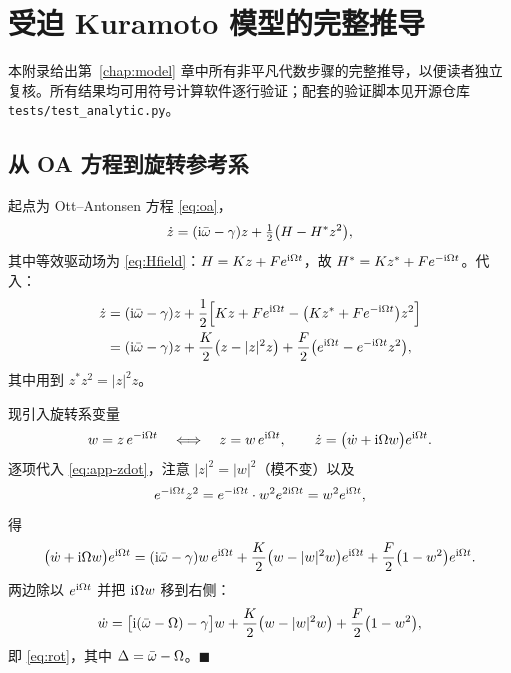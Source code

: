\chapter{受迫 Kuramoto 模型的完整推导}
\label{app:derivation}

本附录给出第~\ref{chap:model} 章中所有非平凡代数步骤的完整推导，以便读者独立
复核。所有结果均可用符号计算软件逐行验证；配套的验证脚本见开源仓库
\texttt{tests/test\_analytic.py}。

\section{从 OA 方程到旋转参考系}
\label{app:rotating}

起点为 Ott--Antonsen 方程 \cref{eq:oa}，
%
\begin{equation}
\dot z=(\mathrm{i}\bar{\omega}-\gamma)z+\tfrac12\bigl(H-H^{*}z^{2}\bigr),
\end{equation}
%
其中等效驱动场为 \cref{eq:Hfield}：$H=Kz+Fe^{\mathrm{i}\Omega t}$，故
$H^{*}=Kz^{*}+Fe^{-\mathrm{i}\Omega t}$。代入：
%
\begin{align}
\dot z
&=(\mathrm{i}\bar{\omega}-\gamma)z
 +\frac12\Bigl[Kz+Fe^{\mathrm{i}\Omega t}-\bigl(Kz^{*}+Fe^{-\mathrm{i}\Omega t}\bigr)z^{2}\Bigr]
 \notag\\
&=(\mathrm{i}\bar{\omega}-\gamma)z
 +\frac{K}{2}\bigl(z-|z|^{2}z\bigr)
 +\frac{F}{2}\bigl(e^{\mathrm{i}\Omega t}-e^{-\mathrm{i}\Omega t}z^{2}\bigr),
 \label{eq:app-zdot}
\end{align}
%
其中用到 $z^{*}z^{2}=|z|^{2}z$。

现引入旋转系变量
%
\begin{equation}
w=z\,e^{-\mathrm{i}\Omega t}
\quad\Longleftrightarrow\quad
z=w\,e^{\mathrm{i}\Omega t},
\qquad
\dot z=\bigl(\dot w+\mathrm{i}\Omega w\bigr)e^{\mathrm{i}\Omega t}.
\end{equation}
%
逐项代入 \cref{eq:app-zdot}，注意 $|z|^{2}=|w|^{2}$（模不变）以及
%
\begin{equation}
e^{-\mathrm{i}\Omega t}z^{2}=e^{-\mathrm{i}\Omega t}\cdot w^{2}e^{2\mathrm{i}\Omega t}=w^{2}e^{\mathrm{i}\Omega t},
\end{equation}
%
得
%
\begin{equation}
\bigl(\dot w+\mathrm{i}\Omega w\bigr)e^{\mathrm{i}\Omega t}
=(\mathrm{i}\bar{\omega}-\gamma)w\,e^{\mathrm{i}\Omega t}
+\frac{K}{2}\bigl(w-|w|^{2}w\bigr)e^{\mathrm{i}\Omega t}
+\frac{F}{2}\bigl(1-w^{2}\bigr)e^{\mathrm{i}\Omega t}.
\end{equation}
%
两边除以 $e^{\mathrm{i}\Omega t}$ 并把 $\mathrm{i}\Omega w$ 移到右侧：
%
\begin{equation}
\dot w=\bigl[\mathrm{i}(\bar{\omega}-\Omega)-\gamma\bigr]w
+\frac{K}{2}\bigl(w-|w|^{2}w\bigr)
+\frac{F}{2}\bigl(1-w^{2}\bigr),
\end{equation}
%
即 \cref{eq:rot}，其中 $\Delta=\bar{\omega}-\Omega$。\hfill$\blacksquare$

